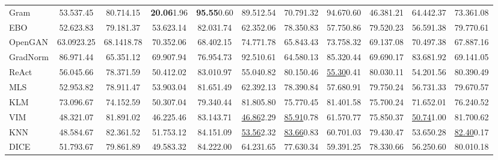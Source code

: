\documentclass{article} \usepackage{iclr2024_conference,times}
\begin{document}
\begin{table*}[h]
{\begin{tabular}{l cc cc cc cc cc}
			Gram & 53.53{\tiny7.45} &  80.71{\tiny4.15} &  \textbf{20.06}{\tiny1.96} &  \textbf{95.55}{\tiny0.60} &  89.51{\tiny2.54} &  70.79{\tiny1.32} &  94.67{\tiny0.60} &  46.38{\tiny1.21} &  64.44{\tiny2.37} &  73.36{\tiny1.08 }\\ 
			EBO & 52.62{\tiny3.83} &  79.18{\tiny1.37} &  53.62{\tiny3.14} &  82.03{\tiny1.74} &  62.35{\tiny2.06} &  78.35{\tiny0.83} &  57.75{\tiny0.86} &  79.52{\tiny0.23} &  56.59{\tiny1.38} &  79.77{\tiny0.61 }\\ 
			OpenGAN & 63.09{\tiny23.25} &  68.14{\tiny18.78} &  70.35{\tiny2.06} &  68.40{\tiny2.15} &  74.77{\tiny1.78} &  65.84{\tiny3.43} &  73.75{\tiny8.32} &  69.13{\tiny7.08} &  70.49{\tiny7.38} &  67.88{\tiny7.16 }\\ 
			GradNorm & 86.97{\tiny1.44} &  65.35{\tiny1.12} &  69.90{\tiny7.94} &  76.95{\tiny4.73} &  92.51{\tiny0.61} &  64.58{\tiny0.13} &  85.32{\tiny0.44} &  69.69{\tiny0.17} &  83.68{\tiny1.92} &  69.14{\tiny1.05 }\\ 
			ReAct & 56.04{\tiny5.66} &  78.37{\tiny1.59} &  50.41{\tiny2.02} &  83.01{\tiny0.97} &  55.04{\tiny0.82} &  80.15{\tiny0.46} &  \underline{55.30}{\tiny0.41} &  80.03{\tiny0.11} &  54.20{\tiny1.56} &  80.39{\tiny0.49 }\\ 
			MLS & 52.95{\tiny3.82} &  78.91{\tiny1.47} &  53.90{\tiny3.04} &  81.65{\tiny1.49} &  62.39{\tiny2.13} &  78.39{\tiny0.84} &  57.68{\tiny0.91} &  79.75{\tiny0.24} &  56.73{\tiny1.33} &  79.67{\tiny0.57 }\\ 
			KLM & 73.09{\tiny6.67} &  74.15{\tiny2.59} &  50.30{\tiny7.04} &  79.34{\tiny0.44} &  81.80{\tiny5.80} &  75.77{\tiny0.45} &  81.40{\tiny1.58} &  75.70{\tiny0.24} &  71.65{\tiny2.01} &  76.24{\tiny0.52 }\\ 
			VIM & 48.32{\tiny1.07} &  81.89{\tiny1.02} &  46.22{\tiny5.46} &  83.14{\tiny3.71} &  \underline{46.86}{\tiny2.29} &  \underline{85.91}{\tiny0.78} &  61.57{\tiny0.77} &  75.85{\tiny0.37} &  \underline{50.74}{\tiny1.00} &  81.70{\tiny0.62 }\\ 
			KNN & 48.58{\tiny4.67} &  82.36{\tiny1.52} &  51.75{\tiny3.12} &  84.15{\tiny1.09} &  \underline{53.56}{\tiny2.32} &  \underline{83.66}{\tiny0.83} &  60.70{\tiny1.03} &  79.43{\tiny0.47} &  53.65{\tiny0.28} &  \underline{82.40}{\tiny0.17 }\\ 
			DICE & 51.79{\tiny3.67} &  79.86{\tiny1.89} &  49.58{\tiny3.32} &  84.22{\tiny2.00} &  64.23{\tiny1.65} &  77.63{\tiny0.34} &  59.39{\tiny1.25} &  78.33{\tiny0.66} &  56.25{\tiny0.60} &  80.01{\tiny0.18 }\\ 

\end{tabular}}
\end{table*}
\end{document}
